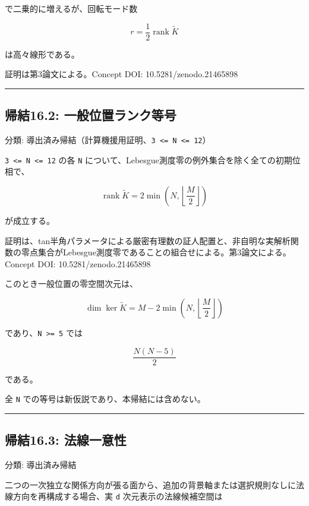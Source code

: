 \documentclass[
  a4paper,
]{ltjsarticle}
\begin{document}
で二乗的に増えるが、回転モード数

\[
r=\frac12\operatorname{rank}\widetilde K
\]

は高々線形である。

証明は第3論文による。Concept DOI: 10.5281/zenodo.21465898

\begin{center}\rule{0.5\linewidth}{0.5pt}\end{center}

\subsection{帰結16.2:
一般位置ランク等号}\label{ux5e30ux7d5016.2-ux4e00ux822cux4f4dux7f6eux30e9ux30f3ux30afux7b49ux53f7}

分類:
導出済み帰結（計算機援用証明、\texttt{3\ \textless{}=\ N\ \textless{}=\ 12}）

\texttt{3\ \textless{}=\ N\ \textless{}=\ 12} の各 \texttt{N}
について、Lebesgue測度零の例外集合を除く全ての初期位相で、

\[
\operatorname{rank}\widetilde K
=
2\min\!\left(N,\left\lfloor\frac{M}{2}\right\rfloor\right)
\]

が成立する。

証明は、tan半角パラメータによる厳密有理数の証人配置と、非自明な実解析関数の零点集合がLebesgue測度零であることの組合せによる。第3論文による。Concept
DOI: 10.5281/zenodo.21465898

このとき一般位置の零空間次元は、

\[
\dim\ker\widetilde K
=
M-2\min\!\left(N,\left\lfloor\frac{M}{2}\right\rfloor\right)
\]

であり、\texttt{N\ \textgreater{}=\ 5} では

\[
\frac{N(N-5)}{2}
\]

である。

全 \texttt{N} での等号は新仮説であり、本帰結には含めない。

\begin{center}\rule{0.5\linewidth}{0.5pt}\end{center}

\subsection{帰結16.3:
法線一意性}\label{ux5e30ux7d5016.3-ux6cd5ux7ddaux4e00ux610fux6027}

分類: 導出済み帰結

二つの一次独立な関係方向が張る面から、追加の背景軸または選択規則なしに法線方向を再構成する場合、実
\texttt{d} 次元表示の法線候補空間は
\end{document}
